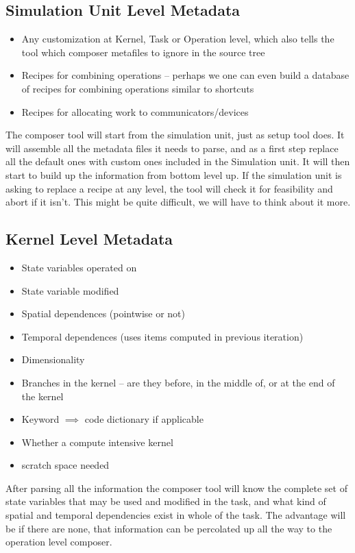 \documentclass{article}
\begin{document}
\subsection{Simulation Unit Level Metadata}
\begin{itemize}
\item Any customization at Kernel, Task or Operation level, which also
  tells the tool which composer metafiles to ignore in the source tree
\item Recipes for combining operations -- perhaps we one can even build a
  database of recipes for combining operations similar to shortcuts
\item Recipes for allocating work to communicators/devices
\end{itemize}
The composer tool will start from the simulation unit, just as setup
tool does. It will assemble all the metadata files it needs to parse,
and as a first step replace all the default ones with custom ones
included in the Simulation unit. It will then start to build up the
information from bottom level up. If the simulation unit is asking to
replace a recipe at any level, the tool will check it for feasibility
and abort if it isn't. This might be quite difficult, we will have to
think about it more. 
 
\subsection{Kernel Level Metadata}
\begin{itemize}
\item State variables operated on
\item State variable modified
\item Spatial dependences (pointwise or not)
\item Temporal dependences (uses items computed in previous
  iteration)
\item Dimensionality
\item Branches in the kernel -- are they before, in the middle of, or
  at the end of the kernel
\item Keyword $\implies$ code dictionary if applicable
\item Whether a compute intensive kernel
\item scratch space needed
\end{itemize}
After parsing all the information the composer tool will know the
complete set of state variables that may be used and modified in the
task, and what kind of spatial and temporal dependencies exist in
whole of the task. The advantage will be if there are none, that
information can be percolated up all the way to the operation level composer.
\end{document}
